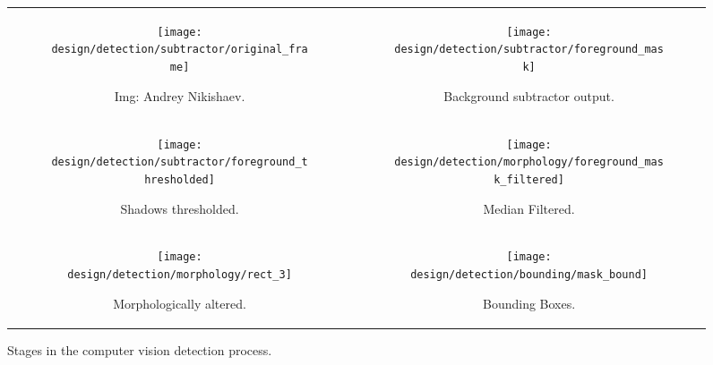 \begin{figure*}[htbp]
    \begin{tabular}{c c}
        \begin{subfigure}[b]{0.45\textwidth}
            \texttt{[image: design/detection/subtractor/original\_frame]}
            \captionsetup{format = hang}
            \caption{Img: Andrey Nikishaev.}
            \label{fig:original_frame}
        \end{subfigure} & 
        \begin{subfigure}[b]{0.45\textwidth}
            \texttt{[image: design/detection/subtractor/foreground\_mask]}
            \captionsetup{format = hang}
            \caption{Background subtractor output.}
            \label{fig:foreground_mask_unfiltered}
        \end{subfigure} \\
        \begin{subfigure}[b]{0.45\textwidth}
            \texttt{[image: design/detection/subtractor/foreground\_thresholded]}
            \captionsetup{format = hang}
            \caption{Shadows thresholded.}
        \end{subfigure} &
        \begin{subfigure}[b]{0.45\textwidth}
            \texttt{[image: design/detection/morphology/foreground\_mask\_filtered]}
            \captionsetup{format = hang}
            \caption{Median Filtered.}
        \end{subfigure} \\
        \begin{subfigure}[b]{0.45\textwidth}
            \texttt{[image: design/detection/morphology/rect\_3]}
            \captionsetup{format = hang}
            \caption{Morphologically altered.}
            \label{fig:morphed}
        \end{subfigure} &
        \begin{subfigure}[b]{0.45\textwidth}
            \texttt{[image: design/detection/bounding/mask\_bound]}
            \captionsetup{format = hang}
            \caption{Bounding Boxes.}
            \label{fig:bounding_boxes}
        \end{subfigure}
    \end{tabular}
    \captionsetup{format=hang}
    \caption{Stages in the computer vision detection process.}
    \label{fig:example_subtraction}
\end{figure*}



